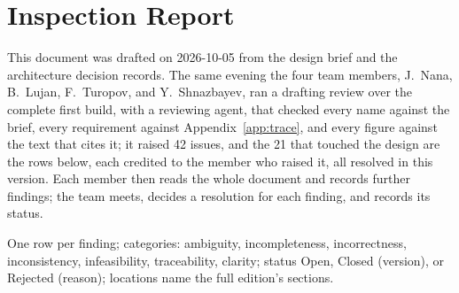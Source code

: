 \section{Inspection Report}\label{app:inspection}

This document was drafted on 2026-10-05 from the design brief and the architecture decision records. The same evening the four team members, J.~Nana, B.~Lujan, F.~Turopov, and Y.~Shnazbayev, ran a drafting review over the complete first build, with a reviewing agent, that checked every name against the brief, every requirement against Appendix~\ref{app:trace}, and every figure against the text that cites it; it raised 42 issues, and the 21 that touched the design are the rows below, each credited to the member who raised it, all resolved in this version. Each member then reads the whole document and records further findings; the team meets, decides a resolution for each finding, and records its status.

One row per finding; categories: ambiguity, incompleteness, incorrectness, inconsistency, infeasibility, traceability, clarity; status Open, Closed (version), or Rejected (reason); locations name the full edition's sections.

